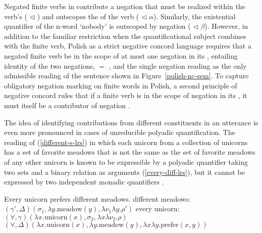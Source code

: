 \documentclass[output=paper
	        ,collection
	        ,collectionchapter
 	        ,biblatex
                ,babelshorthands
                ,newtxmath
                ,draftmode
                ,colorlinks, citecolor=brown
]{langscibook}
\begin{document}
Negated finite verbs in  contribute a negation that must be realized
within the verb's  ( $\triangleleft$ ) and
outscopes the  of the verb ( $\triangleleft$ $\alpha$).
Similarly, the existential quantifier of the n-word  `nobody' is
outscoped by negation ( $\triangleleft$ $\beta$). However, in addition
to the familiar restriction when the quantificational subject combines
with the finite verb, Polish as a strict negative concord language requires
that a negated finite verb be in the scope of at most one negation in
its , entailing identity of the two negations,
 $=$ , and the single negation reading  as
the only admissible reading of the sentence shown in Figure~\ref{polish-nc-sem}.
To capture obligatory negation marking on finite words in Polish, a second
principle of negative concord rules that if a finite verb is in the scope
of negation in its , it must itself be a contributor of negation \citep[316]{RichterandSailer2001}.

The idea of identifying contributions from different constituents in
an utterance is even more pronounced in cases of unreducible polyadic
quantification. The reading of (\ref{different-s-lrs}) in which each
unicorn from a collection of unicorns has a set of favorite meadows that
is not the same as the set of favorite meadows of any other unicorn is known
to be expressible by a polyadic quantifier taking two sets and a binary
relation as arguments (\ref{every-diff-lrs}), but it cannot be expressed by
two independent monadic quantifiers \citep{Keenan1992b}.


\begin{exe}
\ex\label{different-lrs}
\begin{xlist}
\ex\label{different-s-lrs} Every unicorn prefers different meadows.
\ex \label{different-meadows-lrs}
different meadows: \hspace{0.18cm} $(\gamma', \Delta)(\sigma_1, \lambda y.\text{meadow}(y), \lambda \nu_1\lambda y.\rho')$
\ex \label{every-unicorn-lrs}
every unicorn: \hspace{0.95cm}$(\forall, \gamma)(\lambda x.\text{unicorn}(x), \sigma_2, \lambda x\lambda \nu_2.\rho)$
\ex \label{every-diff-lrs}
$(\forall, \Delta)(\lambda x.\text{unicorn}(x), \lambda y.\text{meadow}(y), \lambda x\lambda y.\text{prefer}(x,y))$
\end{xlist}
\end{exe}
\end{document}
